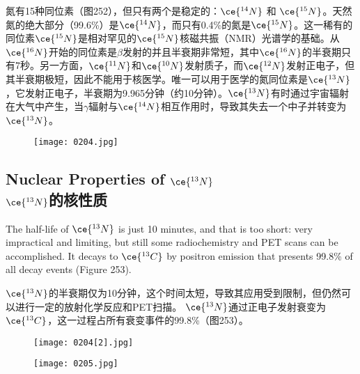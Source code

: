 \documentclass[dvipsnames, svgnames,a4paper,11pt]{article}
\begin{document}
氮有15种同位素（图252），但只有两个是稳定的：\(\ce{^{14}N}\) 和 \(\ce{^{15}N}\)。天然氮的绝大部分（99.6\%）是\(\ce{^{14}N}\)，而只有0.4\%的氮是\(\ce{^{15}N}\)。这一稀有的同位素\(\ce{^{15}N}\)是相对罕见的\(\ce{^{15}N}\)核磁共振（NMR）光谱学的基础。从\(\ce{^{16}N}\)开始的同位素是\(\beta\)发射的并且半衰期非常短，其中\(\ce{^{16}N}\)的半衰期只有7秒。另一方面，\(\ce{^{11}N}\)和\(\ce{^{10}N}\)发射质子，而\(\ce{^{12}N}\)发射正电子，但其半衰期极短，因此不能用于核医学。唯一可以用于医学的氮同位素是\(\ce{^{13}N}\)，它发射正电子，半衰期为9.965分钟（约10分钟）。\(\ce{^{13}N}\)有时通过宇宙辐射在大气中产生，当$\gamma$辐射与\(\ce{^{14}N}\)相互作用时，导致其失去一个中子并转变为\(\ce{^{13}N}\)。

\begin{figure}[h]
	\centering
    \texttt{[image: 0204.jpg]}  
     \label{fig252}
\end{figure}

\subsection{Nuclear Properties of \(\ce{^{13}N}\)\\ \(\ce{^{13}N}\)的核性质}  
The half-life of \(\ce{^{13}N}\) is just 10 minutes, and that is too short: very impractical and limiting, but still some radiochemistry and PET scans can be accomplished. It decays to \(\ce{^{13}C}\) by positron emission that presents 99.8\% of all decay events (Figure 253).  

\(\ce{^{13}N}\)的半衰期仅为10分钟，这个时间太短，导致其应用受到限制，但仍然可以进行一定的放射化学反应和PET扫描。 \(\ce{^{13}N}\)通过正电子发射衰变为\(\ce{^{13}C}\)，这一过程占所有衰变事件的99.8\%（图253）。

\begin{figure}[h]
	\centering
    \texttt{[image: 0204[2].jpg]}  
     \label{fig253}
\end{figure}

\begin{figure}[h]
	\centering
    \texttt{[image: 0205.jpg]}  
     \label{fig254}
\end{figure}
\end{document}
